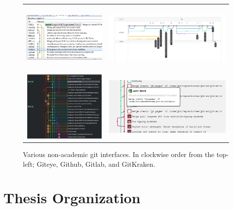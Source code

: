 \begin{figure}[htpb]
  \centering
  \begin{tabular}{cc}
    \includegraphics[height=3.5cm]{Figures/introduction/giteye_graph.jpg}
    &
    \includegraphics[height=3.5cm]{Figures/introduction/github_dag.png}
    \\

    \includegraphics[height=3.5cm]{Figures/introduction/gitkraken_graph.jpg}
    &
    \includegraphics[height=3.5cm]{Figures/introduction/gitlab_graph.jpg}
  \end{tabular}

  \caption{Various non-academic git interfaces. In clockwise order from the
    top-left; Giteye, Github, Gitlab, and GitKraken.}
  \label{fig:non_academic_work}
\end{figure}

\section{Thesis Organization}\label{sec:thesis_organization}

